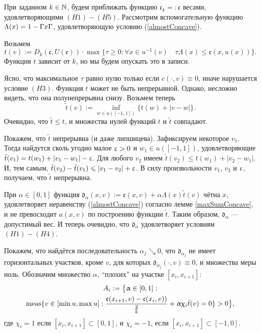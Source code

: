При заданном $k \in \mathbb N$, будем приближать функцию $\mathfrak c_k =: \mathfrak c$ весами, удовлетворяющими $(H1)-(H5)$.
Рассмотрим вспомогательную функцию $\Lambda(x) = 1 - \abs{x}$, удовлетворяющую условию (\ref{almostConcave}).

Возьмем
$$
t(v):=D_k(\mathfrak c, U(\mathfrak c)) \cdot \max\{\tau \ge 0: \forall x \in u^{-1}(v) \quad \tau \Lambda(x) \le \mathfrak c(x, u(x))\}.
$$
Функция $t$ зависит от $k$, но мы будем опускать это в записи.

Ясно, что максимальное $\tau$ равно нулю только если $c(\cdot, v) \equiv 0$, иначе нарушается условие $(H3)$.
Функция $t$ может не быть непрерывной. Однако, несложно видеть, что она полунепрерывна снизу.
Возьмем теперь
$$
\tilde{t}(v) := \inf_{w \in u([-1, 1])} \{t(w) + |v - w|\}.
$$
Очевидно, что $\tilde{t} \le t$, и множества нулей функций $t$ и $\tilde{t}$ совпадают.

Покажем, что $\tilde{t}$ непрерывна (и даже липшицева).
Зафиксируем некоторое $v_1$.
Тогда найдутся сколь угодно малое $\upvarepsilon > 0$ и $w_1 \in u([-1, 1])$,
удовлетворяющие $\tilde{t}(v_1) = t(w_1) + |v_1 - w_1| - \upvarepsilon$.
Для любого $v_2$ имеем $\tilde{t}(v_2) \le t(w_1) + |v_2 - w_1|$.
И, тем самым, $\tilde{t}(v_2) - \tilde{t}(v_1) \leqslant |v_1 - v_2| + \upvarepsilon$.
В силу произвольности $v_1$, $v_2$ и $\upvarepsilon$, получаем, что $\tilde{t}$ непрерывна.

При $\alpha \in [0, 1]$ функция $\mathfrak d_\alpha(x, v) := \mathfrak c(x, v) + \alpha \Lambda(x) \tilde{t}(v)$
чётна $x$, удовлетворяет неравенству (\ref{almostConcave}) согласно лемме \ref{maxSumConcave},
и не превосходит $a(x, v)$ по построению функции $\tilde{t}$.
Таким образом, $\mathfrak d_\alpha$ --- допустимый вес.
И теперь очевидно, что $\mathfrak d_\alpha$ удовлетворяет условиям $(H1)-(H4)$.

Покажем, что найдётся последовательность $\alpha_j \searrow 0$, что $\mathfrak d_{\alpha_j}$ не имеет горизонтальных участков,
кроме $v$, для которых $\mathfrak d_{\alpha_j}(\cdot, v) \equiv 0$, и множества меры ноль.
Обозначим множество $\alpha$, ``плохих'' на участке $[x_i, x_{i + 1}]$:
\begin{multline*}
A_i := \bigl \{\alpha \in [0, 1]: \\
\meas \{v \in [\min u, \max u]: \frac{\mathfrak c(x_{i + 1}, v) - \mathfrak c(x_i, v))}{\frac{2}{k}} + \alpha \chi_i \tilde{t} (v) = 0 \} > 0 \bigr \},
\end{multline*}
где $\chi_i = 1$ если $[x_i, x_{i + 1}] \subset [0, 1]$, и $\chi_i = -1$, если $[x_i, x_{i + 1}] \subset [-1, 0]$.

